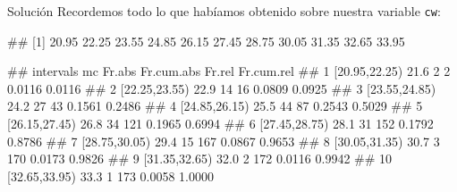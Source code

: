 \documentclass[
  ignorenonframetext,
  aspectratio=169]{beamer}
\let\oldverbatim\verbatim
\let\endoldverbatim\endverbatim
\renewenvironment{verbatim}{\tiny\oldverbatim}{\endoldverbatim}
\begin{document}
\begin{frame}[fragile]{Solución}
\protect\hypertarget{soluciuxf3n-30}{}
Recordemos todo lo que habíamos obtenido sobre nuestra variable
\texttt{cw}:

\begin{verbatim}
##  [1] 20.95 22.25 23.55 24.85 26.15 27.45 28.75 30.05 31.35 32.65 33.95
\end{verbatim}

\begin{verbatim}
##        intervals   mc Fr.abs Fr.cum.abs Fr.rel Fr.cum.rel
## 1  [20.95,22.25) 21.6      2          2 0.0116     0.0116
## 2  [22.25,23.55) 22.9     14         16 0.0809     0.0925
## 3  [23.55,24.85) 24.2     27         43 0.1561     0.2486
## 4  [24.85,26.15) 25.5     44         87 0.2543     0.5029
## 5  [26.15,27.45) 26.8     34        121 0.1965     0.6994
## 6  [27.45,28.75) 28.1     31        152 0.1792     0.8786
## 7  [28.75,30.05) 29.4     15        167 0.0867     0.9653
## 8  [30.05,31.35) 30.7      3        170 0.0173     0.9826
## 9  [31.35,32.65) 32.0      2        172 0.0116     0.9942
## 10 [32.65,33.95) 33.3      1        173 0.0058     1.0000
\end{verbatim}
\end{frame}
\end{document}
